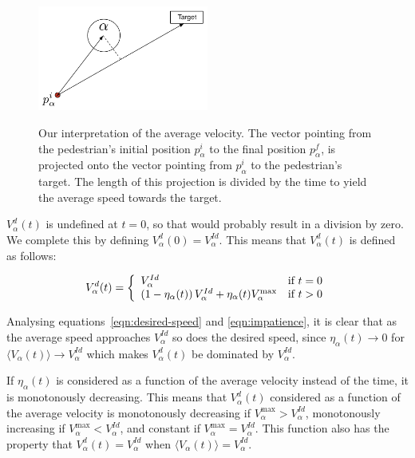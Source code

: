 \begin{figure}[ht]
    \centering
    {\includegraphics[width=0.5\textwidth]{Figures/impatience.pdf}}
    \caption[Our interpretation of the average velocity]{Our interpretation of
    the average velocity. The vector pointing from the pedestrian's initial
    position $p^i_\alpha$ to the final position $p^f_\alpha$, 
    is projected onto the vector pointing from
    $p^i_\alpha$ to the pedestrian's target. The length of this projection is
    divided by the time to yield the average speed towards the target.}
    \label{impatience}
\end{figure}

$V^d_\alpha(t)$ is undefined at $t=0$, so that would probably result in a
division by zero. We complete
this by defining $V^d_\alpha(0)=V^{Id}_\alpha$. This means that $V^d_\alpha(t)$
is defined as follows:

\begin{equation}\label{eqn:cond-define}
    V_{\alpha}^{d} (t) = \left\{
    \begin{array}{l l}
        V_\alpha^{Id} & \text{if $t=0$}\\
        \left( 1 - \eta_{\alpha}(t) \right)
        V^{Id}_{\alpha} +
        \eta_{\alpha}(t) V_{\alpha}^{\text{max}}
        & \text{if $t > 0$}\\
    \end{array} \right.
\end{equation}

Analysing equations~\eqref{eqn:desired-speed} and \eqref{eqn:impatience}, it
is clear that as the average speed approaches $V^{Id}_\alpha$ so does the
desired speed, since $\eta_\alpha(t)\rightarrow0$ for $\langle V_\alpha(t)
\rangle \rightarrow V^{Id}_\alpha$ which makes $V^d_\alpha(t)$ be dominated by
$V^{Id}_\alpha$.

If $\eta_\alpha(t)$ is considered as a function of the average velocity
instead of the time, it is monotonously decreasing. This means that
$V^d_\alpha(t)$ considered as a function of the average velocity is
monotonously decreasing if $V^{\text{max}}_\alpha > V^{Id}_\alpha$,
monotonously increasing if $V^{\text{max}}_\alpha < V^{Id}_\alpha$, and
constant if $V^{\text{max}}_\alpha = V^{Id}_\alpha$. This function also has
the property that $V^d_\alpha(t)=V^{Id}_\alpha$ when $\langle V_\alpha(t)
\rangle = V^{Id}_\alpha$.

